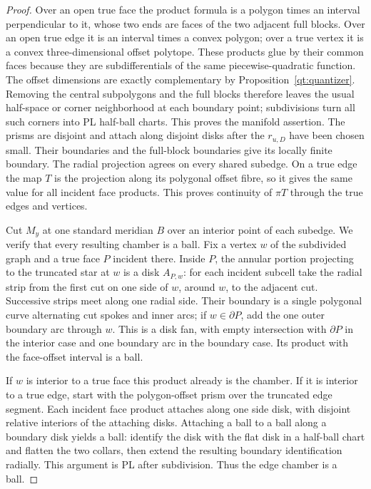 \documentclass[11pt]{article}
\numberwithin{equation}{section}
\theoremstyle{definition}
\theoremstyle{remark}
\begin{document}
\begin{proof}
Over an open true face the product formula is a polygon times an
interval perpendicular to it, whose two ends are faces of the two
adjacent full blocks.  Over an open true edge it is an interval times
a convex polygon; over a true vertex it is a convex three-dimensional
offset polytope.  These products glue by their common faces because
they are subdifferentials of the same piecewise-quadratic function.
The offset dimensions are exactly complementary by
Proposition~\ref{qt:quantizer}.  Removing the central subpolygons and
the full blocks therefore leaves the usual half-space or corner
neighborhood at each boundary point; subdivisions turn all such
corners into PL half-ball charts.  This proves the manifold assertion.
The prisms are disjoint and attach along disjoint disks after the
$r_{u,D}$ have been chosen small.  Their boundaries and the full-block
boundaries give its locally finite boundary.  The radial projection
agrees on every shared subedge.  On a true edge the map $T$ is the
projection along its polygonal offset fibre, so it gives the same
value for all incident face products.  This proves continuity of
$\pi T$ through the true edges and vertices.

Cut $M_y$ at one standard meridian $B$ over an interior point of each
subedge.  We verify that every resulting chamber is a ball.  Fix a
vertex $w$ of the subdivided graph and a true face $P$ incident there.
Inside $P$, the annular portion projecting to the truncated star at
$w$ is a disk $A_{P,w}$: for each incident subcell take the radial strip
from the first cut on one side of $w$, around $w$, to the adjacent
cut.  Successive strips meet along one radial side.  Their boundary
is a single polygonal curve alternating cut spokes and inner arcs;
if $w\in\partial P$, add the one outer boundary arc through $w$.
This is a disk fan, with empty intersection with $\partial P$ in the
interior case and one boundary arc in the boundary case.
Its product with the face-offset interval is a ball.

If $w$ is interior to a true face this product already is the chamber.
If it is interior to a true edge, start with the polygon-offset prism
over the truncated edge segment.  Each incident face product attaches
along one side disk, with disjoint relative interiors of the attaching
disks.  Attaching a ball to a ball along a boundary disk yields a ball:
identify the disk with the flat disk in a half-ball chart and flatten
the two collars, then extend the resulting boundary identification
radially.  This argument is PL after subdivision.  Thus the edge
chamber is a ball.


\end{proof}
\end{document}

